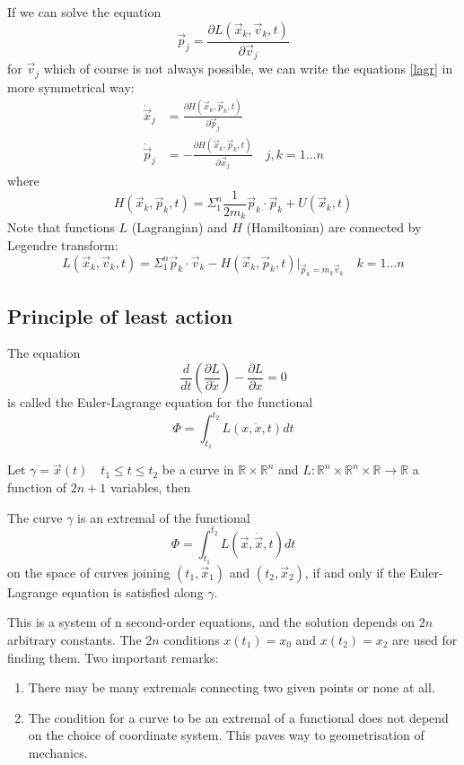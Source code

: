 If we can solve the equation 
\[ \vec p_j=\frac{\partial L(\vec x_k,\vec v_k,t)}
{\partial \vec v_j} \] 
for $ \vec v_j $
which of course is not always possible, we can write the equations \eqref{lagr}
in more symmetrical way:
\begin{equation}
   \label {ham}
   \begin{split}
        \dot \vec x_j&=\frac{\partial H(\vec x_k,\vec p_k,t)}{\partial \vec p_j}  \\ 
        \dot \vec p_j&= -\frac{\partial H(\vec x_k,\vec p_k,t)}{\partial \vec x_j}\quad j,k=1\ldots n    
   \end{split}
\end{equation}
where 
\begin{equation}
        H(\vec x_k,\vec p_k,t)=\Sigma_1^n \frac{1}{2 m_k} \vec p_k \cdot \vec p_k+U(\vec x_k,t) \label{ham3}
\end{equation}
Note that functions $L$ (Lagrangian) and $H$ (Hamiltonian) are connected by Legendre transform:
\begin{equation}
        L(\vec x_k,\vec v_k,t)=\Sigma_1^n  \vec p_k \cdot \vec v_k -H(\vec x_k,\vec p_k,t)|_{\vec p_k=m_k\vec v_k}
\quad k=1\ldots n \label {lagr-ham}
\end{equation}


\subsection{Principle of least action}
\label{least-action}
\begin{definition}
        The equation
        \[\frac{d}{d t}(\frac{\partial L}{\partial \dot x})-\frac{\partial L}{\partial  x}=0 \]
        is called the Euler-Lagrange equation for the functional
        \[\Phi=\int_{t_1}^{t_2} L(x,\dot x,t) dt \]
\end{definition}
Let \( \gamma= \vec x(t) \quad t_1 \le t \le t_2 \) be a curve  in  $\mathbb{R} \times \mathbb{R}^n$ and 
$L: \mathbb{R}^n \times \mathbb{R}^n \times \mathbb{R}\rightarrow \mathbb{R}$ a function of $2 n +1$
variables, then
\begin{theorem}
         The curve $\gamma$ is an extremal of the functional \[\Phi=\int_{t_1}^{t_2} L(\vec x,\dot \vec x,t) dt \]
        on the space of curves joining $(t_1, \vec x_1)$ and $(t_2,\vec x_2)$, if and only if the Euler-
Lagrange equation is satisfied along $\gamma$.
\end{theorem}
This is a system of n second-order equations, and the solution depends on
$2 n$ arbitrary constants. The $2 n$ conditions $x(t_1) = x_0$ and $x(t_2) = x_2$ are used
for finding them.
Two important remarks:
\begin{enumerate}
        \item There may be many extremals connecting two
given points or none at all.
\item The condition for a curve  to be an extremal of a functional does not depend
on the choice of coordinate system. This paves way to geometrisation of mechanics.
\end{enumerate}

